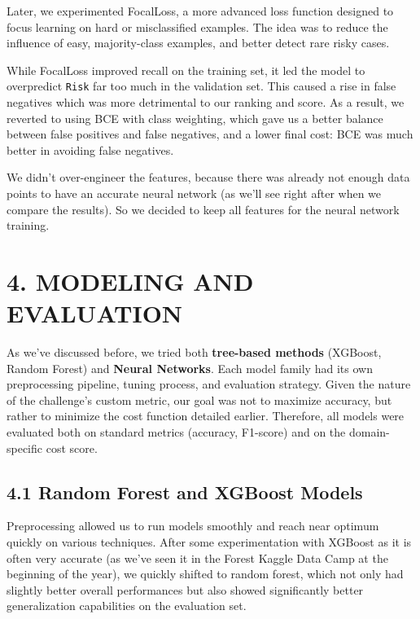 \documentclass[12pt]{report}
\begin{document}
Later, we experimented FocalLoss, a more advanced loss function designed to focus learning on hard or misclassified examples. The idea was to reduce the influence of easy, majority-class examples, and better detect rare risky cases.

While FocalLoss improved recall on the training set, it led the model to overpredict \texttt{Risk} far too much in the validation set. This caused a rise in false negatives which was more detrimental to our ranking and score. As a result, we reverted to using BCE with class weighting, which gave us a better balance between false positives and false negatives, and a lower final cost: BCE was much better in avoiding false negatives.

We didn't over-engineer the features, because there was already not enough data points to have an accurate neural network (as we'll see right after when we compare the results). So we decided to keep all features for the neural network training.





\section*{4. MODELING AND EVALUATION}

As we've discussed before, we tried both \textbf{tree-based methods} (XGBoost, Random Forest) and \textbf{Neural Networks}. Each model family had its own preprocessing pipeline, tuning process, and evaluation strategy. Given the nature of the challenge's custom metric, our goal was not to maximize accuracy, but rather to minimize the cost function detailed earlier. Therefore, all models were evaluated both on standard metrics (accuracy, F1-score) and on the domain-specific cost score.

\subsection*{4.1 Random Forest and XGBoost Models}

Preprocessing allowed us to run models smoothly and reach near optimum quickly on various techniques. After some experimentation with XGBoost as it is often very accurate (as we've seen it in the Forest Kaggle Data Camp at the beginning of the year), we quickly shifted to random forest, which not only had slightly better overall performances but also showed significantly better generalization capabilities on the evaluation set. 
\end{document}
